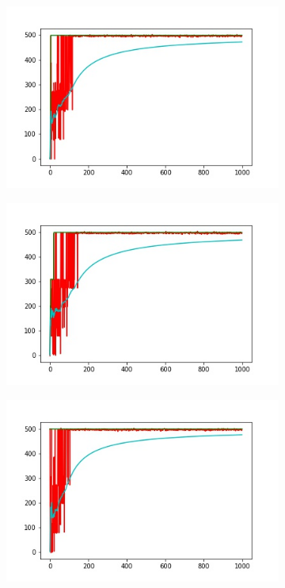 \begin{figure}
\begin{subfigure}[b]{0.39\textwidth}
        \includegraphics[width=\textwidth]{grafi3.jpg}
        \label{fig:mouse}
    \end{subfigure}
    \begin{subfigure}[b]{0.39\textwidth}
        \includegraphics[width=\textwidth]{grafi4.jpg}
        \label{fig:tiger}
    \end{subfigure}
        \begin{subfigure}[b]{0.39\textwidth}
        \includegraphics[width=\textwidth]{grafi5.jpg}

\end{subfigure}
\end{figure}
